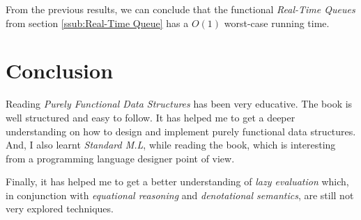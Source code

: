 \documentclass[12pt, a4paper]{article} %
\begin{document}
From the previous results, we can conclude that the functional \textit{Real-Time Queues} from section \ref{ssub:Real-Time Queue} has a $O(1)$ worst-case running time.




\section{Conclusion}%
\label{sec:conclusion}

Reading \textit{Purely Functional Data Structures} has been very educative. The book is well structured and easy to follow. It has helped me to get a deeper understanding on how to design and implement purely functional data structures. And, I also learnt \textit{Standard M.L}, while reading the book, which is interesting from a programming language designer point of view.

Finally, it has helped me to get a better understanding of \textit{lazy evaluation} which, in conjunction with \textit{equational reasoning} and \textit{denotational semantics}, are still not very explored techniques.








\end{document}
